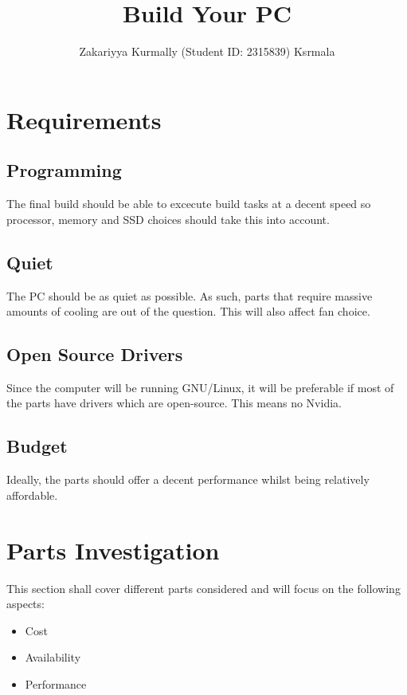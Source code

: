 \documentclass[12pt, a4paper]{article}
\title{Build Your PC}
\author{Zakariyya Kurmally (Student ID: 2315839) Ksrmala}
\begin{document}
\maketitle
\pagebreak
\tableofcontents
\pagebreak


\section{Requirements}

\subsection{Programming}
The final build should be able to excecute build tasks at a decent speed
so processor, memory and SSD choices should take this into account.

\subsection{Quiet}
The PC should be as quiet as possible. As such, parts that require 
massive amounts of cooling are out of the question. This will also
affect fan choice.

\subsection{Open Source Drivers}
Since the computer will be running GNU/Linux, it will be preferable if most of 
the parts have drivers which are open-source. This means no Nvidia.

\subsection{Budget}
Ideally, the parts should offer a decent performance whilst being
relatively affordable.



\section{Parts Investigation}
This section shall cover different parts considered and will focus on the 
following aspects:
\begin{itemize}
  \item Cost 
  \item Availability 
  \item Performance
\end{itemize}
\end{document}
